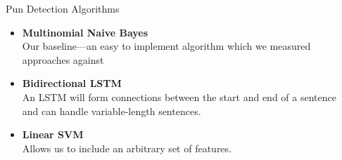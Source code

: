 \documentclass[final]{beamer}
\newlength{\onecolwid}
\newlength{\twocolwid}
\begin{document}
\begin{frame}[t]
\begin{columns}[t]
\begin{column}{\twocolwid}
\begin{columns}[t,totalwidth=\twocolwid]
\begin{column}{\onecolwid}
\begin{block}{Pun Detection Algorithms}
{\begin{itemize}
								\item {\textbf{Multinomial Naive Bayes}\\
									Our baseline---an easy to implement algorithm which we measured approaches against
								}
								\item {\textbf{Bidirectional LSTM}\\
									An LSTM will form connections between the start and end of a sentence and can handle variable-length sentences.
								}
								\item {\textbf{Linear SVM}\\ 
									Allows us to include an arbitrary set of features.
								}
							\end{itemize}
						}
					\end{block}
				\end{column}
				\begin{column}{\onecolwid}\vspace{-.6in}
				

\end{column}
\end{columns}
\end{column}
\end{columns}
\end{frame}
\end{document}
